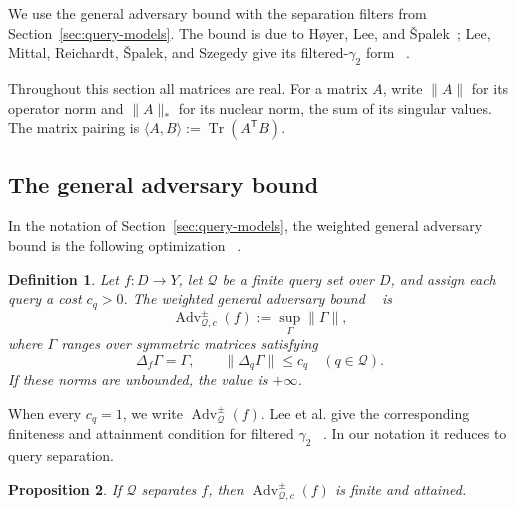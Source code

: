 \documentclass[11pt]{article}
\numberwithin{equation}{section}
\newtheorem{definition}{Definition}[section]
\newtheorem{proposition}[definition]{Proposition}
\theoremstyle{remark}
\begin{document}
We use the general adversary bound with the separation filters from
Section~\ref{sec:query-models}. The bound is due to H{\o}yer, Lee, and
{\v S}palek~\cite{HoyerLeeSpalek2007}; Lee, Mittal, Reichardt,
{\v S}palek, and Szegedy give its filtered-$\gamma_2$ form
~\cite{LeeMittalReichardtSpalekSzegedy2011}.

Throughout this section all matrices are real.  For a matrix $A$, write
$\|A\|$ for its operator norm and $\|A\|_*$ for its nuclear norm, the sum of
its singular values.  The matrix pairing is
$\langle A,B\rangle:=\operatorname{Tr}(A^{\mathsf T}B)$.

\subsection{The general adversary bound}
\label{subsec:general-adversary-bound}

In the notation of Section~\ref{sec:query-models}, the weighted general
adversary bound is the following optimization
~\cite{HoyerLeeSpalek2007,LeeMittalReichardtSpalekSzegedy2011}.

\begin{definition}
\label{def:general-adversary-bound-weighted}
\label{def:general-adversary-bound}
Let $f:D\to Y$, let $\mathcal Q$ be a finite query set over $D$, and assign
each query a cost $c_q>0$. The \emph{weighted general adversary bound}
~\cite{HoyerLeeSpalek2007,LeeMittalReichardtSpalekSzegedy2011} is
\begin{equation}
    \operatorname{Adv}^{\pm}_{\mathcal Q,c}(f)
    :=
    \sup_\Gamma \|\Gamma\|,
\end{equation}
where $\Gamma$ ranges over symmetric matrices satisfying
\begin{equation}
    \Delta_f\Gamma=\Gamma,
    \qquad
    \|\Delta_q\Gamma\|\leq c_q
    \quad(q\in\mathcal Q).
\end{equation}
If these norms are unbounded, the value is $+\infty$.
\end{definition}

When every $c_q=1$, we write
$\operatorname{Adv}^{\pm}_{\mathcal Q}(f)$. Lee et al. give the
corresponding finiteness and attainment condition for filtered $\gamma_2$
~\cite{LeeMittalReichardtSpalekSzegedy2011}. In our notation it reduces to
query separation.

\begin{proposition}
\label{prop:adversary-attainment}
If $\mathcal Q$ separates $f$, then
$\operatorname{Adv}^{\pm}_{\mathcal Q,c}(f)$ is finite and attained.
\end{proposition}
\end{document}
